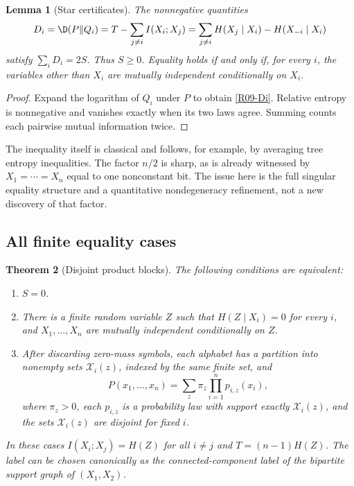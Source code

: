 \documentclass[11pt,a4paper]{article}
\newtheorem{theorem}{Theorem}[section]
\newtheorem{lemma}[theorem]{Lemma}
\theoremstyle{definition}\newtheorem{definition}[theorem]{Definition}
\theoremstyle{remark}\newtheorem{remark}[theorem]{Remark}
\numberwithin{equation}{section}
\begin{document}
\begin{lemma}[Star certificates]\label{R09-stars}
The nonnegative quantities
\begin{equation}\label{R09-Di}
 D_i=\D(P\Vert Q_i)=T-\sum_{j\ne i}I(X_i;X_j)
 =\sum_{j\ne i}H(X_j\mid X_i)-H(X_{-i}\mid X_i)
\end{equation}
satisfy $\sum_iD_i=2S$. Thus $S\ge0$. Equality holds if and only if, for every $i$, the variables other than $X_i$ are mutually independent conditionally on $X_i$.
\end{lemma}
\begin{proof}
Expand the logarithm of $Q_i$ under $P$ to obtain \eqref{R09-Di}. Relative entropy is nonnegative and vanishes exactly when its two laws agree. Summing counts each pairwise mutual information twice.
\end{proof}

The inequality itself is classical and follows, for example, by averaging tree entropy inequalities. The factor $n/2$ is sharp, as is already witnessed by $X_1=\cdots=X_n$ equal to one nonconstant bit. The issue here is the full singular equality structure and a quantitative nondegeneracy refinement, not a new discovery of that factor.

\subsection{All finite equality cases}\label{R09-sec-2}
\begin{theorem}[Disjoint product blocks]\label{R09-blocks}
The following conditions are equivalent:
\begin{enumerate}[label=(\roman*)]
\item $S=0$.
\item There is a finite random variable $Z$ such that $H(Z\mid X_i)=0$ for every $i$, and $X_1,\ldots,X_n$ are mutually independent conditionally on $Z$.
\item After discarding zero-mass symbols, each alphabet has a partition into nonempty sets $\mathcal X_i(z)$, indexed by the same finite set, and
\begin{equation}\label{R09-blocklaw}
 P(x_1,\ldots,x_n)=\sum_z\pi_z\prod_{i=1}^np_{i,z}(x_i),
\end{equation}
where $\pi_z>0$, each $p_{i,z}$ is a probability law with support exactly $\mathcal X_i(z)$, and the sets $\mathcal X_i(z)$ are disjoint for fixed $i$.
\end{enumerate}
In these cases $I(X_i;X_j)=H(Z)$ for all $i\ne j$ and $T=(n-1)H(Z)$. The label can be chosen canonically as the connected-component label of the bipartite support graph of $(X_1,X_2)$.
\end{theorem}
\end{document}
